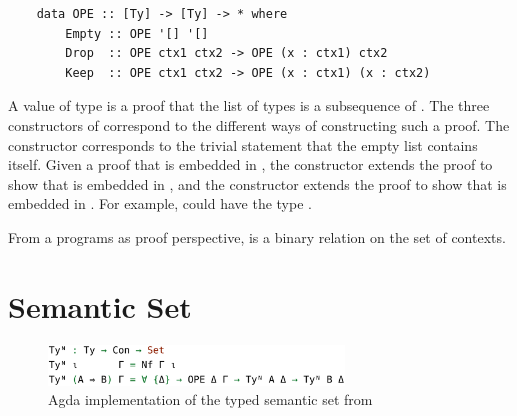 \begin{lstlisting}
    data OPE :: [Ty] -> [Ty] -> * where
        Empty :: OPE '[] '[]
        Drop  :: OPE ctx1 ctx2 -> OPE (x : ctx1) ctx2
        Keep  :: OPE ctx1 ctx2 -> OPE (x : ctx1) (x : ctx2)
\end{lstlisting}

A value of type  is a proof that the list of types  is a subsequence of . The three constructors of  correspond to the different ways of constructing such a proof. The  constructor corresponds to the trivial statement that the empty list contains itself. Given a proof that  is embedded in , the  constructor extends the proof to show that  is embedded in , and the  constructor extends the proof to show that  is embedded in . For example,  could have the type . 

From a programs as proof perspective,  is a binary relation on the set of contexts.



\section{Semantic Set}

\begin{figure}[h]
    \centering
    \includegraphics[width=0.7\textwidth]{./images/typed_semantic_set.png}
    \caption{Agda implementation of the typed semantic set from \cite{AgdaNbe}}
    \label{fig:agdaSemanticSet}
\end{figure}



